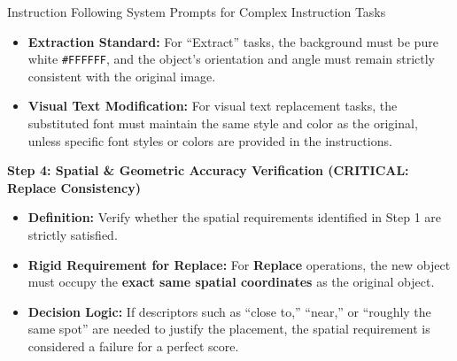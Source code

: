 \documentclass{llmxive}
\begin{document}
\begin{promptbox}[label={System Prompts: IF_Complex_Instruction}]{Instruction Following System Prompts for Complex Instruction Tasks}
\begin{itemize}[leftmargin=2.2em, labelsep=0.4em, itemsep=2pt]
    \begin{itemize}
        \item \textbf{Strict Utilization of Source Objects:} The model must utilize the existing object from the source image. Generating a new, redundant object while the original remains in its initial position is strictly prohibited and constitutes a significant failure to follow instructions.
        
        \item \textbf{Mandatory Interaction:} If the user asks to ``pick up a cup,'' the original cup must disappear from its starting location and reappear in the subject's hand. Any ``cloning'' effect where the object exists in both the old and new positions is a significant failure to follow instructions.
    \end{itemize}
    
    \item \textbf{Extraction Standard:} For ``Extract'' tasks, the background must be pure white \texttt{\#FFFFFF}, and the object's orientation and angle must remain strictly consistent with the original image.
    
    \item \textbf{Visual Text Modification:} For visual text replacement tasks, the substituted font must maintain the same style and color as the original, unless specific font styles or colors are provided in the instructions.
\end{itemize}

\medskip

\textbf{Step 4: Spatial \& Geometric Accuracy Verification (CRITICAL: Replace Consistency)}

\begin{itemize}[leftmargin=2.2em, labelsep=0.4em, itemsep=2pt]
    \item \textbf{Definition:} Verify whether the spatial requirements identified in Step 1 are strictly satisfied.
    
    \item \textbf{Rigid Requirement for Replace:} For \textbf{Replace} operations, the new object must occupy the \textbf{exact same spatial coordinates} as the original object.
    
    \item \textbf{Decision Logic:} If descriptors such as ``close to,'' ``near,'' or ``roughly the same spot'' are needed to justify the placement, the spatial requirement is considered a failure for a perfect score.
\end{itemize}


\end{promptbox}
\end{document}
